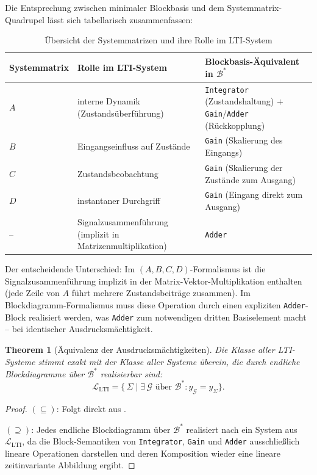 ﻿\documentclass[12pt,a4paper]{article}
\newtheorem{theorem}{Theorem}[section]
\theoremstyle{definition}
\begin{document}
Die Entsprechung zwischen minimaler Blockbasis und dem Systemmatrix-Quadrupel
lässt sich tabellarisch zusammenfassen:

\begin{table}
\centering
\renewcommand{\arraystretch}{1.25}
\begin{tabular}{llp{5.5cm}}
  \toprule
  \textbf{Systemmatrix} & \textbf{Rolle im LTI-System}
    & \textbf{Blockbasis-Äquivalent in $\mathcal{B}^*$} \\
  \midrule
  $A$ & interne Dynamik (Zustandsüberführung)
    & \texttt{Integrator} (Zustandshaltung) $+$
      \texttt{Gain}/\texttt{Adder} (Rückkopplung) \\
  $B$ & Eingangseinfluss auf Zustände
    & \texttt{Gain} (Skalierung des Eingangs) \\
  $C$ & Zustandsbeobachtung
    & \texttt{Gain} (Skalierung der Zustände zum Ausgang) \\
  $D$ & instantaner Durchgriff
    & \texttt{Gain} (Eingang direkt zum Ausgang) \\
  \midrule
  --  & Signalzusammenführung (implizit in Matrizenmultiplikation)
    & \texttt{Adder} \\
  \bottomrule
\end{tabular}
\caption{Übersicht der Systemmatrizen und ihre Rolle im LTI-System}
\label{tab:overview}
\end{table}

\smallskip
Der entscheidende Unterschied: Im $(A,B,C,D)$-Formalismus ist die
Signalzusammenführung implizit in der Matrix-Vektor-Multiplikation enthalten
(jede Zeile von $A$ führt mehrere Zustandsbeiträge zusammen). Im
Blockdiagramm-Formalismus muss diese Operation durch einen expliziten
\texttt{Adder}-Block realisiert werden, was \texttt{Adder} zum notwendigen
dritten Basiselement macht -- bei identischer Ausdrucksmächtigkeit.

\begin{theorem}[Äquivalenz der Ausdrucksmächtigkeiten]
\label{thm:aequivalenz}
Die Klasse aller LTI-Systeme stimmt exakt mit der Klasse aller Systeme
überein, die durch endliche Blockdiagramme über $\mathcal{B}^*$ realisierbar
sind:
\[
  \mathcal{L}_{\mathrm{LTI}}
  = \bigl\{\,\Sigma \;\big|\;
    \exists\,\mathcal{G} \text{ über } \mathcal{B}^* : y_{\mathcal{G}} = y_{\Sigma}
  \bigr\}.
\]
\end{theorem}

\begin{proof}
$(\subseteq)$: Folgt direkt aus .

$(\supseteq)$: Jedes endliche Blockdiagramm über $\mathcal{B}^*$ realisiert
nach  ein System aus $\mathcal{L}_{\mathrm{LTI}}$, da die
Block-Semantiken von \texttt{Integrator}, \texttt{Gain} und \texttt{Adder}
ausschließlich lineare Operationen darstellen und deren Komposition wieder
eine lineare zeitinvariante Abbildung ergibt.
\end{proof}
\end{document}

